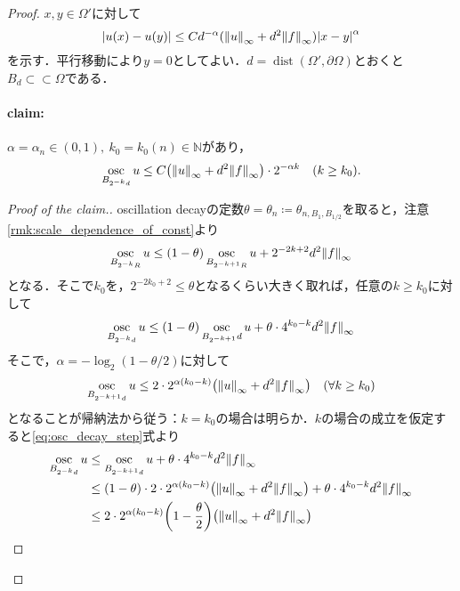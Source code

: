 \documentclass[a4paper]{ltjsarticle}
\newcommand{\Nset}{\mathbb{N}}
\newcommand{\Om}{\Omega}
\newcommand{\pOm}{\partial\Omega}
\newcommand{\ssubset}{\subset\subset}
\newcommand{\1}{\mathbbm{1}}
\DeclareMathOperator{\dist}{\mathrm{dist}}
\DeclareMathOperator*{\osc}{\mathrm{osc}}
\numberwithin{equation}{section}
\theoremstyle{definition}
\begin{document}
\begin{proof}
    $x,y\in\Om'$に対して 
    \begin{equation}
        \abs{u(x)-u(y)}\leq Cd^{-\alpha}(\norm{u}_{\infty}+d^2\norm{f}_{\infty})\abs{x-y}^\alpha 
    \end{equation}
    を示す．平行移動により$y=0$としてよい．$d=\dist(\Om',\pOm)$とおくと$B_d\ssubset \Om$である．
    \paragraph{claim:}$\alpha=\alpha_n\in(0,1),\ k_0=k_0(n)\in\Nset$があり，
    \begin{equation}
        \osc_{B_{2^{-k}d}}u\leq C\qty(\norm{u}_{\infty}+d^2\norm{f}_{\infty})\cdot 2^{-\alpha k}\quad (k\geq k_0).
    \end{equation}
    \begin{proof}[Proof of the claim.]
        oscillation decayの定数$\theta=\theta_n\coloneqq\theta_{n,B_1,B_{1/2}}$を取ると，注意\ref{rmk:scale_dependence_of_const}より
        \begin{equation}
            \osc_{B_{2^{-k}R}}u\leq (1-\theta)\osc_{B_{2^{-k+1}R}}u+2^{-2k+2}d^2\norm{f}_{\infty}
        \end{equation}
        となる．そこで$k_0$を，$2^{-2k_0+2}\leq \theta$となるくらい大きく取れば，任意の$k\geq k_0$に対して
        \begin{equation}
            \osc_{B_{2^{-k}d}}u\leq (1-\theta)\osc_{B_{2^{-k+1}}d}u+\theta\cdot 4^{k_0-k}d^2\norm{f}_{\infty}\label{eq:osc_decay_step}
        \end{equation}
        そこで，$\alpha=-\log_2(1-\theta/2)$に対して
        \begin{equation}
            \osc_{B_{2^{-k+1}d}}u\leq 2\cdot 2^{\alpha(k_0-k)}\qty(\norm{u}_{\infty}+d^2\norm{f}_{\infty})\quad (\forall k\geq k_0)
        \end{equation}
        となることが帰納法から従う：$k=k_0$の場合は明らか．$k$の場合の成立を仮定すると\eqref{eq:osc_decay_step}式より
        \begin{align}
            \osc_{B_{2^{-k}d}}u&\leq \osc_{B_{2^{-k+1}d}}u+\theta\cdot 4^{k_0-k}d^2\norm{f}_{\infty}\\
            &\leq (1-\theta)\cdot 2\cdot 2^{\alpha(k_0-k)}\qty(\norm{u}_{\infty}+d^2\norm{f}_{\infty})+\theta\cdot 4^{k_0-k}d^2\norm{f}_{\infty}\\
            &\leq 2\cdot 2^{\alpha(k_0-k)}\qty(1-\frac{\theta}{2})\qty(\norm{u}_{\infty}+d^2\norm{f}_{\infty})\\

\end{align}
\end{proof}
\end{proof}
\end{document}
